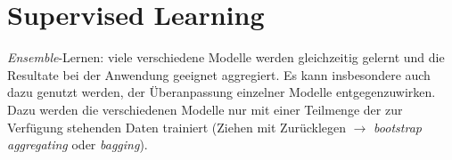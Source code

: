 
\section{Supervised Learning}

\emph{Ensemble}-Lernen: viele verschiedene Modelle werden gleichzeitig gelernt und die Resultate bei der Anwendung geeignet aggregiert. Es kann insbesondere auch dazu genutzt werden, der Überanpassung einzelner Modelle entgegenzuwirken. Dazu werden die verschiedenen Modelle nur mit einer Teilmenge der zur Verfügung stehenden Daten trainiert (Ziehen mit Zurücklegen $\rightarrow$ \emph{bootstrap aggregating} oder \emph{bagging}).








